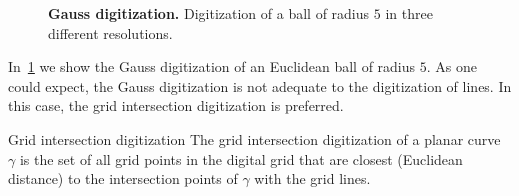 \begin{figure}
{}
\caption{\textbf{Gauss digitization.} Digitization of a ball of radius $5$ in three different resolutions.}
\label{ch5:fig:gauss-digitization}
\end{figure}

In~\cref{ch5:fig:gauss-digitization} we show the Gauss digitization of an Euclidean ball of radius $5$. As one could expect, the Gauss digitization is not adequate to the digitization of lines. In this case, the grid intersection digitization is preferred.

\begin{definition}{Grid intersection digitization}
The grid intersection digitization of a planar curve $\gamma$ is the set of all grid points in the digital grid that are closest (Euclidean distance) to the intersection points of $\gamma$ with the grid lines.
\end{definition}

